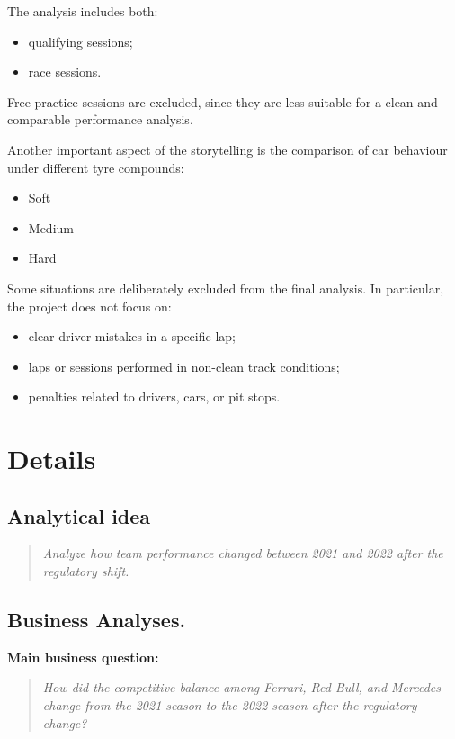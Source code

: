 \documentclass[12pt,a4paper]{article}
\begin{document}
	The analysis includes both:
	\begin{itemize}
		\item qualifying sessions;
		\item race sessions.
	\end{itemize}
	
	Free practice sessions are excluded, since they are less suitable for a clean and comparable performance analysis.
	
	Another important aspect of the storytelling is the comparison of car behaviour under different tyre compounds:
	\begin{itemize}
		\item Soft
		\item Medium
		\item Hard
	\end{itemize}
	
	Some situations are deliberately excluded from the final analysis. In particular, the project does not focus on:
	\begin{itemize}
		\item clear driver mistakes in a specific lap;
		\item laps or sessions performed in non-clean track conditions;
		\item penalties related to drivers, cars, or pit stops.
	\end{itemize}
	

	\section*{Details}
	
	\subsection*{Analytical idea}
	

	\begin{quote}
		\textit{Analyze how team performance changed between 2021 and 2022 after the regulatory shift.}
	\end{quote}

	\subsection*{Business Analyses. }
	
	
	\textbf{Main business question:}
	\begin{quote}
		\textit{How did the competitive balance among Ferrari, Red Bull, and Mercedes change from the 2021 season to the 2022 season after the regulatory change?}
	\end{quote}
	
\end{document}
